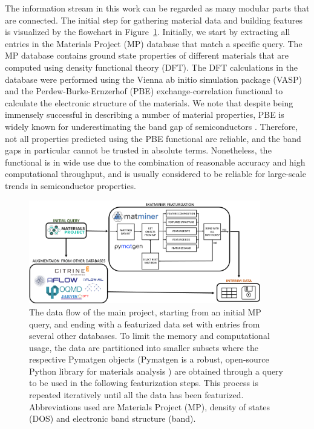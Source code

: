 \documentclass[superscriptaddress,unsortedaddress,
 amsmath,amssymb,
 aps,
]{revtex4-2}
\begin{document}
The information stream in this work can be regarded as many modular parts 
that are connected. 
The initial step for gathering material data and building features is visualized by the  flowchart in Figure~\ref{fig:flowchart}. 
Initially, we start by extracting all entries in the Materials Project (MP) database that match a specific query. 
The MP database contains ground state properties of different materials that are computed using density functional theory (DFT). The DFT calculations in the database were performed using the Vienna ab initio simulation package (VASP) \cite{Kresse1996} and the Perdew-Burke-Ernzerhof (PBE) \cite{Perdew1996} exchange-correlation functional to calculate the electronic structure of the materials. 
We note that despite being immensely successful in describing a number of material properties, PBE is widely known for underestimating the band gap of semiconductors \cite{Freysoldt2014}. Therefore, not all properties predicted using the PBE functional are reliable, and the band gaps in particular cannot be trusted in absolute terms. Nonetheless, the functional is in wide use due to the combination of reasonable accuracy and high computational throughput, and is usually considered to be reliable for large-scale trends in semiconductor properties. 

\begin{figure}[t]
    \centering
    \includegraphics[width=0.9\textwidth]{figures/flow_chart_2.png}
    \caption{The data flow of the main project, starting from an initial MP query, and ending with a featurized data set with entries from several other databases. To limit the memory and computational usage, the data are partitioned into smaller subsets where the respective Pymatgen objects  
    (Pymatgen is a robust, open-source Python library for materials analysis \cite{pymatgen}) 
    are obtained through a query to be used in the following featurization steps. This process is repeated iteratively until all the data has been featurized. Abbreviations used are Materials Project (MP), density of states (DOS) and electronic band structure (band).
    }
    \label{fig:flowchart}
\end{figure}
\end{document}
